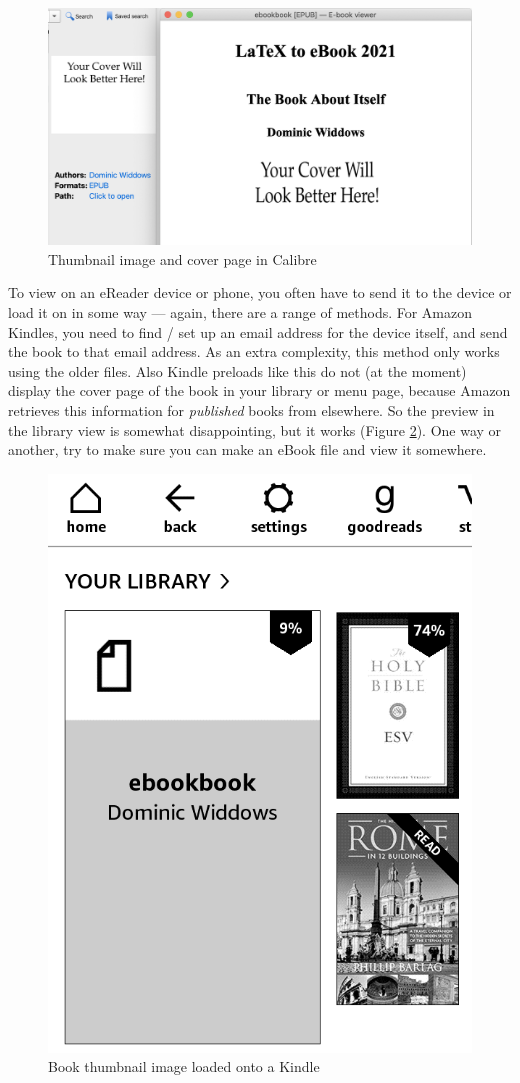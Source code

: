 \begin{figure}
  \begin{center}
    \includegraphics[width=\linewidth]{images/calibre_screenshot.png}
    \htbr
    \caption{Thumbnail image and cover page in Calibre}
\label{fig:calibre_screenshot}
\end{center}
\end{figure}

To view on an eReader device or phone, you often have to send it to
the device or load it on in some way --- again, there are a range of
methods. For Amazon Kindles, you need to find / set up an email address for the
device itself, and send the book to that email address. As an extra
complexity, this method only works using the older 
files.  Also Kindle preloads like this do not (at the moment)
display the cover page of the book in your library or menu page,
because Amazon retrieves this information for {\em published} books
from elsewhere. So the preview in the library view is somewhat
disappointing, but it works (Figure \ref{fig:kindle_screenshot}).
One way or another, try to make sure you can make an eBook file and view it somewhere.

\begin{figure}
  \begin{center}
  \includegraphics[width=0.6\linewidth]{images/kindle_screenshot.png}
  \htbr
  \caption{Book thumbnail image loaded onto a Kindle}
  \label{fig:kindle_screenshot}
 \end{center}
\end{figure}

